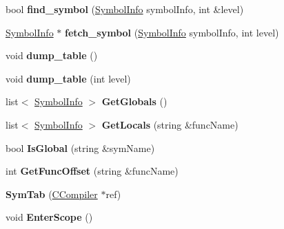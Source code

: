 \begin{DoxyCompactItemize}
\item 
\hypertarget{classSymTab_a2aedd91e00780c889e60a60fc0795daf}{bool {\bfseries find\-\_\-symbol} (\hyperlink{structSymbolInfo}{Symbol\-Info} symbol\-Info, int \&level)}\label{classSymTab_a2aedd91e00780c889e60a60fc0795daf}

\item 
\hypertarget{classSymTab_ac0bfd9c56cfd8e697046178629adbebc}{\hyperlink{structSymbolInfo}{Symbol\-Info} $\ast$ {\bfseries fetch\-\_\-symbol} (\hyperlink{structSymbolInfo}{Symbol\-Info} symbol\-Info, int level)}\label{classSymTab_ac0bfd9c56cfd8e697046178629adbebc}

\item 
\hypertarget{classSymTab_ab4c005eb114053be22fdbe315542f55b}{void {\bfseries dump\-\_\-table} ()}\label{classSymTab_ab4c005eb114053be22fdbe315542f55b}

\item 
\hypertarget{classSymTab_ad5d45136f341bf024a226fe600fb4dcc}{void {\bfseries dump\-\_\-table} (int level)}\label{classSymTab_ad5d45136f341bf024a226fe600fb4dcc}

\item 
\hypertarget{classSymTab_aced837e720830dd9ccb2d3dde621d489}{list$<$ \hyperlink{structSymbolInfo}{Symbol\-Info} $>$ {\bfseries Get\-Globals} ()}\label{classSymTab_aced837e720830dd9ccb2d3dde621d489}

\item 
\hypertarget{classSymTab_a76b5a70170535019b1fe58fa25a9998c}{list$<$ \hyperlink{structSymbolInfo}{Symbol\-Info} $>$ {\bfseries Get\-Locals} (string \&func\-Name)}\label{classSymTab_a76b5a70170535019b1fe58fa25a9998c}

\item 
\hypertarget{classSymTab_a4c4699d90ffd605b205e9e94be9eacde}{bool {\bfseries Is\-Global} (string \&sym\-Name)}\label{classSymTab_a4c4699d90ffd605b205e9e94be9eacde}

\item 
\hypertarget{classSymTab_a793c31d247f484b04a9283e71f172756}{int {\bfseries Get\-Func\-Offset} (string \&func\-Name)}\label{classSymTab_a793c31d247f484b04a9283e71f172756}

\item 
\hypertarget{classSymTab_a20c7b65c7ffb728fa792e87258d381a2}{{\bfseries Sym\-Tab} (\hyperlink{classCCompiler}{C\-Compiler} $\ast$ref)}\label{classSymTab_a20c7b65c7ffb728fa792e87258d381a2}

\item 
\hypertarget{classSymTab_af335dd1ba840dfab4219856545d5d8ef}{void {\bfseries Enter\-Scope} ()}\label{classSymTab_af335dd1ba840dfab4219856545d5d8ef}


\end{DoxyCompactItemize}
